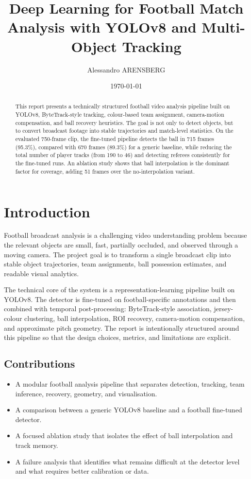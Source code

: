 \documentclass[11pt,a4paper]{article}
\title{Deep Learning for Football Match Analysis with YOLOv8 and Multi-Object Tracking}
\author{Alessandro ARENSBERG}
\date{\today}
\begin{document}
\maketitle

\begin{abstract}
This report presents a technically structured football video analysis pipeline built on YOLOv8, ByteTrack-style tracking, colour-based team assignment, camera-motion compensation, and ball recovery heuristics. The goal is not only to detect objects, but to convert broadcast footage into stable trajectories and match-level statistics. On the evaluated 750-frame clip, the fine-tuned pipeline detects the ball in 715 frames (95.3\%), compared with 670 frames (89.3\%) for a generic baseline, while reducing the total number of player tracks (from 190 to 46) and detecting referees consistently for the fine-tuned runs. An ablation study shows that ball interpolation is the dominant factor for coverage, adding 51 frames over the no-interpolation variant.
\end{abstract}

\tableofcontents
\newpage

\section{Introduction}
Football broadcast analysis is a challenging video understanding problem because the relevant objects are small, fast, partially occluded, and observed through a moving camera. The project goal is to transform a single broadcast clip into stable object trajectories, team assignments, ball possession estimates, and readable visual analytics.

The technical core of the system is a representation-learning pipeline built on YOLOv8. The detector is fine-tuned on football-specific annotations and then combined with temporal post-processing: ByteTrack-style association, jersey-colour clustering, ball interpolation, ROI recovery, camera-motion compensation, and approximate pitch geometry. The report is intentionally structured around this pipeline so that the design choices, metrics, and limitations are explicit.

\subsection{Contributions}
\begin{itemize}
  \item A modular football analysis pipeline that separates detection, tracking, team inference, recovery, geometry, and visualisation.
  \item A comparison between a generic YOLOv8 baseline and a football fine-tuned detector.
  \item A focused ablation study that isolates the effect of ball interpolation and track memory.
  \item A failure analysis that identifies what remains difficult at the detector level and what requires better calibration or data.
\end{itemize}
\end{document}
